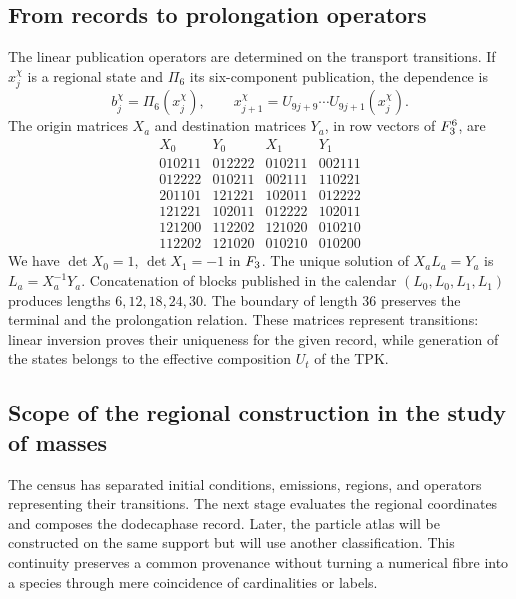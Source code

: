 \subsection{From records to prolongation operators}

The linear publication operators are determined on the
transport transitions. If \(x_j^\chi\) is a regional state
and \(\Pi_6\) its six-component publication, the dependence is
\[
 b_j^\chi=\Pi_6(x_j^\chi),\qquad
 x_{j+1}^\chi=U_{9j+9}\cdots U_{9j+1}(x_j^\chi).
\]
The origin matrices \(X_a\) and destination matrices \(Y_a\), in
row vectors of \(F_3^6\), are
\[
\begin{array}{c|c|c|c}
X_0&Y_0&X_1&Y_1\\\hline
010211&012222&010211&002111\\
012222&010211&002111&110221\\
201101&121221&102011&012222\\
121221&102011&012222&102011\\
121200&112202&121020&010210\\
112202&121020&010210&010200
\end{array}
\]
We have \(\det X_0=1\), \(\det X_1=-1\) in \(F_3\).
The unique solution of \(X_aL_a=Y_a\) is \(L_a=X_a^{-1}Y_a\).
Concatenation of blocks published in the calendar
\((L_0,L_0,L_1,L_1)\) produces lengths
\(6,12,18,24,30\). The boundary of length \(36\) preserves
the terminal and the prolongation relation. These matrices
represent transitions: linear inversion proves their uniqueness
for the given record, while generation of the states
belongs to the effective composition \(U_t\) of the TPK.

\subsection{Scope of the regional construction in the study of masses}

The census has separated initial conditions, emissions, regions, and
operators representing their transitions. The next stage
evaluates the regional coordinates and composes the dodecaphase record.
Later, the particle atlas will be constructed on the same
support but will use another classification. This continuity preserves
a common provenance without turning a numerical fibre into a
species through mere coincidence of cardinalities or labels.
